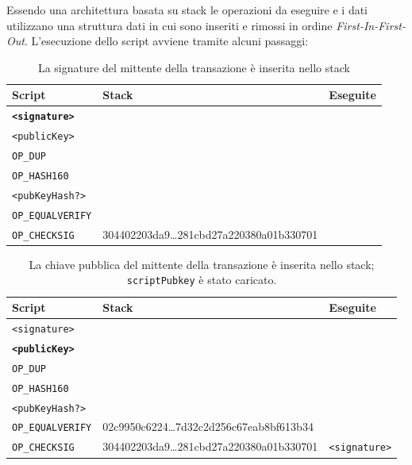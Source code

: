 Essendo una architettura basata su stack le operazioni da eseguire e i dati utilizzano una struttura dati in cui sono inseriti e rimossi in ordine \textit{First-In-First-Out}.\newline
L'esecuzione dello script avviene tramite alcuni passaggi:
\begin{table}[H]
    \centering
    \begin{tabular}{p{3cm}|p{7.7cm}|p{3cm}}
        Script & Stack & Eseguite\\
        \hline
        \texttt{\textbf{<signature>}} & &\\
        \texttt{<publicKey>}          & &\\
        \texttt{OP\_DUP}              & &\\
        \texttt{OP\_HASH160}          & &\\
        \texttt{<pubKeyHash?>}        & &\\
        \texttt{OP\_EQUALVERIFY}      & &\\
        \texttt{OP\_CHECKSIG}         & 304402203da9\dots281cbd27a220380a01b330701 & \\
    \end{tabular}
    \caption{La signature del mittente della transazione è inserita nello stack}
\end{table}

\begin{table}[H]
    \centering
    \begin{tabular}{p{3cm}|p{7.7cm}|p{3cm}}
        Script & Stack & Eseguite\\
        \hline
        \texttt{<signature>}          & &\\
        \texttt{\textbf{<publicKey>}} & &\\
        \texttt{OP\_DUP}              & &\\
        \texttt{OP\_HASH160}          & &\\
        \texttt{<pubKeyHash?>}        & &\\
        \texttt{OP\_EQUALVERIFY}      & 02c9950c6224\dots7d32c2d256c67eab8bf613b34 &\\
        \texttt{OP\_CHECKSIG}         & 304402203da9\dots281cbd27a220380a01b330701 & \texttt{<signature>}\\
    \end{tabular}
    \caption{La chiave pubblica del mittente della transazione è inserita nello stack; \texttt{scriptPubkey} è stato caricato.}
\end{table}

